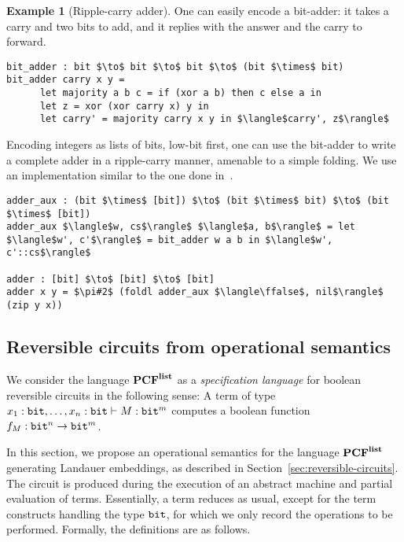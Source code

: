 \documentclass{article}
\theoremstyle{plain}
\theoremstyle{definition}
\newtheorem{example}[theorem]{Example}
\newcommand{\PCF}{\mbox{${\bf PCF}^{\bf list}$}}
\newcommand{\bit}{{\tt bit}}
\newcommand{\define}[1]{{\em #1}}
\newcommand{\ffalse}{\mathtt{f\!f}}
\begin{document}
\begin{example}[Ripple-carry adder]\label{ex:adder}
  One can easily encode a bit-adder: it takes a carry and two
  bits to add, and it replies with the answer and the carry to forward.
\begin{Verbatim}[fontsize=\relsize{-2},commandchars=\\\{\},
  codes={\catcode`$=3\catcode`^=7}]
bit_adder : bit $\to$ bit $\to$ bit $\to$ (bit $\times$ bit)
bit_adder carry x y =
      let majority a b c = if (xor a b) then c else a in
      let z = xor (xor carry x) y in
      let carry' = majority carry x y in $\langle$carry', z$\rangle$
\end{Verbatim}
  Encoding integers as lists of bits, low-bit first, one can use the
  bit-adder to write a complete adder in a ripple-carry manner,
  amenable to a simple folding.
  We use an implementation
  similar to the one done in~\cite{Quipper}.
\begin{Verbatim}[fontsize=\relsize{-2},commandchars=\\\{\},
  codes={\catcode`$=3\catcode`^=7\catcode`\#=8}]
adder_aux : (bit $\times$ [bit]) $\to$ (bit $\times$ bit) $\to$ (bit $\times$ [bit])
adder_aux $\langle$w, cs$\rangle$ $\langle$a, b$\rangle$ = let $\langle$w', c'$\rangle$ = bit_adder w a b in $\langle$w', c'::cs$\rangle$

adder : [bit] $\to$ [bit] $\to$ [bit]
adder x y = $\pi#2$ (foldl adder_aux $\langle\ffalse$, nil$\rangle$ (zip y x))
\end{Verbatim}
\end{example}


\subsection{Reversible circuits from operational semantics}
\label{sec:op-sem-rev-circ}

We consider the language \PCF{} as a \define{specification language} for
boolean reversible circuits in the following sense: A term of type
$x_1:\bit,\ldots,x_n:\bit\vdash M:\bit^m$ computes a boolean function
$f_M : \bit^n\to \bit^m$.

In this section, we propose an operational semantics for the language
\PCF{} generating Landauer embeddings, as
described in Section~\ref{sec:reversible-circuits}. The circuit is
produced during the execution of an abstract machine and partial
evaluation of terms. Essentially, a term reduces as usual, except for
the term constructs handling the type $\bit$, for which we only record
the operations to be performed. Formally, the definitions are as
follows.
\end{document}
